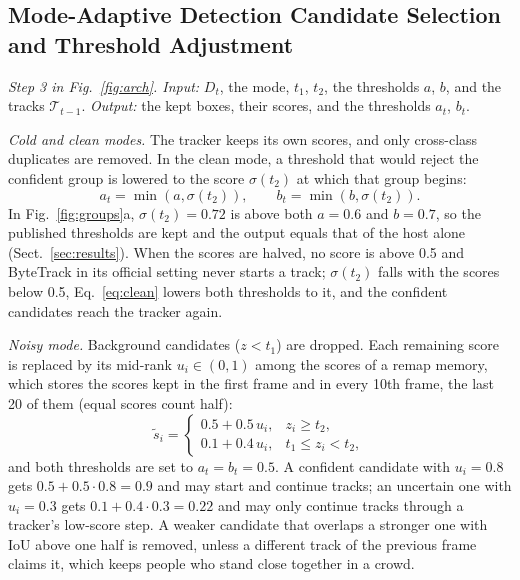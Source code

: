 \subsection{Mode-Adaptive Detection Candidate Selection and Threshold Adjustment}\label{sec:choice}
\emph{Step 3 in Fig.~\ref{fig:arch}. Input:} $D_t$, the mode, $t_1$, $t_2$, the thresholds $a$, $b$,
and the tracks $\mathcal{T}_{t-1}$. \emph{Output:} the kept boxes, their scores, and the thresholds
$a_t$, $b_t$.

\emph{Cold and clean modes.} The tracker keeps its own scores, and only cross-class duplicates are
removed. In the clean mode, a threshold that would reject the confident group is lowered to the
score $\sigma(t_2)$ at which that group begins:
\begin{equation}
a_t=\min\!\left(a,\sigma(t_2)\right),\qquad b_t=\min\!\left(b,\sigma(t_2)\right).
\label{eq:clean}
\end{equation}
In Fig.~\ref{fig:groups}a, $\sigma(t_2)=0.72$ is above both $a=0.6$ and $b=0.7$, so the published
thresholds are kept and the output equals that of the host alone (Sect.~\ref{sec:results}). When the
scores are halved, no score is above 0.5 and ByteTrack in its official setting never starts a track;
$\sigma(t_2)$ falls with the scores below 0.5, Eq.~\eqref{eq:clean} lowers both thresholds to it, and
the confident candidates reach the tracker again.

\emph{Noisy mode.} Background candidates ($z<t_1$) are dropped. Each remaining score is replaced by
its mid-rank $u_i\in(0,1)$ among the scores of a remap memory, which stores the scores kept in the
first frame and in every 10th frame, the last 20 of them (equal scores count half):
\begin{equation}
\tilde{s}_i=
\begin{cases}
0.5+0.5\,u_i, & z_i\ge t_2,\\
0.1+0.4\,u_i, & t_1\le z_i<t_2,
\end{cases}
\label{eq:remap}
\end{equation}
and both thresholds are set to $a_t=b_t=0.5$. A confident candidate with $u_i=0.8$ gets
$0.5+0.5\cdot0.8=0.9$ and may start and continue tracks; an uncertain one with $u_i=0.3$ gets
$0.1+0.4\cdot0.3=0.22$ and may only continue tracks through a tracker's low-score step. A weaker
candidate that overlaps a stronger one with IoU above one half is removed, unless a different track of
the previous frame claims it, which keeps people who stand close together in a crowd.

